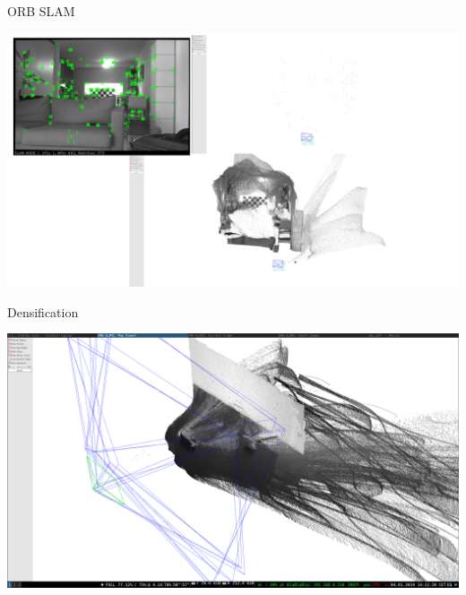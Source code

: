 \documentclass[aspectratio=169]{beamer}
\begin{document}
\note{
}


\begin{frame}{ORB SLAM}
  \begin{center}
    \includegraphics[height=0.9\textheight]{./img/orbslam.png}
  \end{center}
\end{frame}

\note{
}

\begin{frame}{Densification}
  \begin{center}
    \includegraphics[height=0.9\textheight]{./img/pointcloud.png}
  \end{center}
\end{frame}

\note{
}
\end{document}
